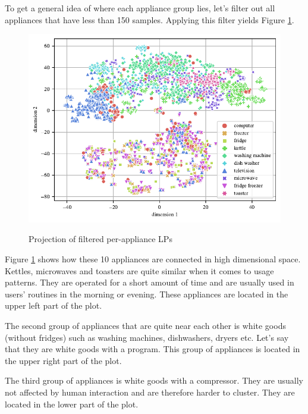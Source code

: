 
To get a general idea of where each appliance group lies,
let's filter out all appliances that have less than 150 samples.
Applying this filter yields Figure \ref{fig:tsne_papb_scatter_all_reduced}.

\begin{figure}[H]
	\centering
	\caption{Projection of filtered per-appliance LPs}
	\includegraphics[]{Figures/TSNE/TSNE_PHPA/phpa_reduced_15.pdf}
	\label{fig:tsne_papb_scatter_all_reduced}
\end{figure}

Figure \ref{fig:tsne_papb_scatter_all_reduced} shows how these 10 appliances are connected in high dimensional space.
Kettles, microwaves and toasters are quite similar when it comes to usage patterns.
They are operated for a short amount of time and are usually used in users' routines in the morning or evening.
These appliances are located in the upper left part of the plot.

The second group of appliances that are quite near each other is white
goods (without fridges) such as washing machines, dishwashers, dryers etc.
Let's say that they are white goods with a program. 
This group of appliances is located in the upper right part of the plot.

The third group of appliances is white goods with a compressor.
They are usually not affected by human interaction and are therefore harder to cluster.
They are located in the lower part of the plot.

